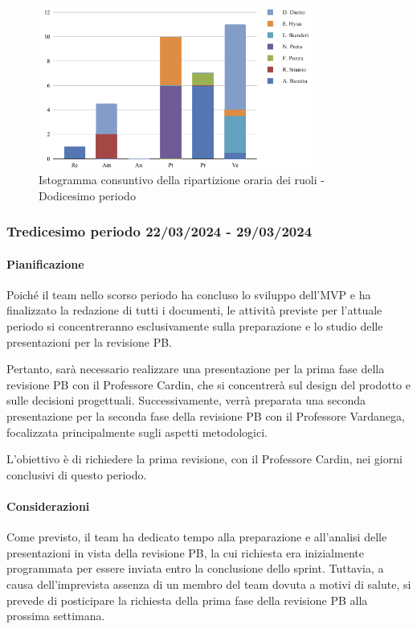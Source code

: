 \begin{figure}[H]
    \centering
    \includegraphics[width=0.8\textwidth]{../Images/graficoConsPrev12.png}
    \caption{Istogramma consuntivo della ripartizione oraria dei ruoli - Dodicesimo periodo}
    \label{fig:Consuntivo_ripartizione_oraria_12}
\end{figure}




\subsubsection{Tredicesimo periodo  22/03/2024 - 29/03/2024}
\paragraph{Pianificazione}
Poiché il team nello scorso periodo ha concluso lo sviluppo dell'MVP e ha finalizzato la redazione di tutti i documenti, le attività previste per l'attuale periodo si concentreranno esclusivamente sulla preparazione e lo studio delle presentazioni per la revisione PB.

Pertanto, sarà necessario realizzare una presentazione per la prima fase della revisione PB con il Professore Cardin, che si concentrerà sul design del prodotto e sulle decisioni progettuali. Successivamente, verrà preparata una seconda presentazione per la seconda fase della revisione PB con il Professore Vardanega, focalizzata principalmente sugli aspetti metodologici.

L'obiettivo è di richiedere la prima revisione, con il Professore Cardin, nei giorni conclusivi di questo periodo.

\paragraph{Considerazioni}
Come previsto, il team ha dedicato tempo alla preparazione e all'analisi delle presentazioni in vista della revisione PB, la cui richiesta era inizialmente programmata per essere inviata entro la conclusione dello sprint. Tuttavia, a causa dell'imprevista assenza di un membro del team dovuta a motivi di salute, si prevede di posticipare la richiesta della prima fase della revisione PB alla prossima settimana.

